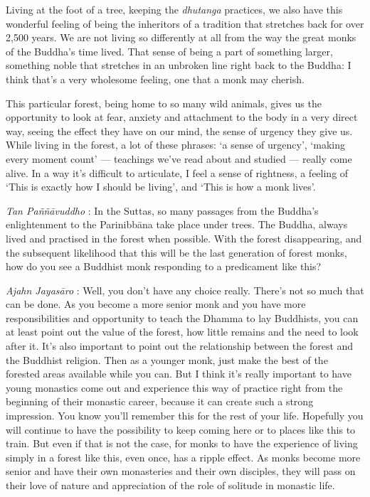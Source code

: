 Living at the foot of a tree, keeping the \emph{dhutanga} practices, we
also have this wonderful feeling of being the inheritors of a tradition
that stretches back for over 2,500 years. We are not living so
differently at all from the way the great monks of the Buddha's time
lived. That sense of being a part of something larger, something noble
that stretches in an unbroken line right back to the Buddha: I think
that's a very wholesome feeling, one that a monk may cherish.

This particular forest, being home to so many wild animals, gives us the
opportunity to look at fear, anxiety and attachment to the body in a
very direct way, seeing the effect they have on our mind, the sense of
urgency they give us. While living in the forest, a lot of these
phrases: `a sense of urgency', `making every moment count' --- teachings
we've read about and studied --- really come alive. In a way it's
difficult to articulate, I feel a sense of rightness, a feeling of `This
is exactly how I should be living', and `This is how a monk lives'.

\emph{Tan Paññāvuddho} : In the Suttas, so many passages from the
Buddha's enlightenment to the Parinibbāna take place under trees. The
Buddha, always lived and practised in the forest when possible. With the
forest disappearing, and the subsequent likelihood that this will be the
last generation of forest monks, how do you see a Buddhist monk
responding to a predicament like this?

\emph{Ajahn Jayasāro }: Well, you don't have any choice really. There's
not so much that can be done. As you become a more senior monk and you
have more responsibilities and opportunity to teach the Dhamma to lay
Buddhists, you can at least point out the value of the forest, how
little remains and the need to look after it. It's also important to
point out the relationship between the forest and the Buddhist religion.
Then as a younger monk, just make the best of the forested areas
available while you can. But I think it's really important to have young
monastics come out and experience this way of practice right from the
beginning of their monastic career, because it can create such a strong
impression. You know you'll remember this for the rest of your life.
Hopefully you will continue to have the possibility to keep coming here
or to places like this to train. But even if that is not the case, for
monks to have the experience of living simply in a forest like this,
even once, has a ripple effect. As monks become more senior and have
their own monasteries and their own disciples, they will pass on their
love of nature and appreciation of the role of solitude in monastic
life.

